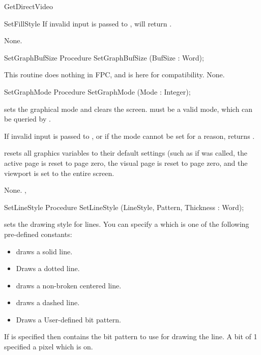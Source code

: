 \begin{function}{GetDirectVideo}
\begin{procedure}{SetFillStyle}
If invalid input is passed to ,
 will return .

\Errors
None.
\SeeAlso
{}
\end{procedure}
\begin{procedure}{SetGraphBufSize}
\Declaration
Procedure SetGraphBufSize (BufSize : Word);

\Description
This routine does nothing in FPC, and is here for compatibility.
\Errors
None.
\SeeAlso

\end{procedure}
\begin{procedure}{SetGraphMode}
\Declaration
Procedure SetGraphMode (Mode : Integer);

\Description
{} sets the
graphical mode and clears the screen.  must be a valid mode,
which can be queried by .

If invalid input is passed to , or if the mode cannot
be set for a reason,  returns .

 resets all graphics variables to their default
settings (such as if  was called, the active page
is reset to page zero, the visual page is reset to page zero, and the viewport
is set to the entire screen.

\Errors
None.
\SeeAlso
{}, 
\end{procedure}
\begin{procedure}{SetLineStyle}
\Declaration
Procedure SetLineStyle (LineStyle, Pattern, Thickness : Word);

\Description
{}
sets the drawing style for lines. You can specify a  which is
one of the following pre-defined constants:
\begin{itemize}
\item {} draws a solid line.
\item {} Draws a dotted line.
\item {} draws a non-broken centered line.
\item {} draws a dashed line.
\item {} Draws a User-defined bit pattern.
\end{itemize}
If  is specified then  contains the bit pattern to
use for drawing the line. A bit of 1 specified a pixel which is on.


\end{procedure}
\end{function}
